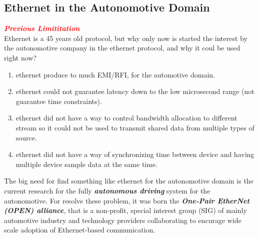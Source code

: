 \subsection{Ethernet in the Autonomotive Domain}
\begin{boxA}
    \textcolor{red}{\textbf{\textit{Previous Limititation}}} \\
    Ethernet is a 45 years old protocol, but why only now is started the interest by the autonomotive company in the ethernet protocol, and why it coul be used right now?
    \begin{enumerate}[nosep]
        \item ethernet produce to much EMI/RFI, for the automotive domain.
        \item ethernet could not guarantee latency down to the low microsecond range (not guarantee time constraints).
        \item ethernet did not have a way to control bandwidth allocation to different stream so it could not be used to transmit shared data from multiple types of source.
        \item ethernet did not have a way of synchronizing time between device and having multiple device sample data at the same time.
    \end{enumerate}
\end{boxA}
The big need for find something like ethernet for the autonomotive domain is the current research for the fully \textbf{\textit{autonomous driving}} system for the autonomotive.
For resolve these problem, it was born the \textbf{\textit{One-Pair EtherNet (OPEN) alliance}}, that is a non-profit, special interest group (SIG) of mainly automotive industry and technology providers collaborating to encurage wide scale adoption of Ethernet-based communication.

